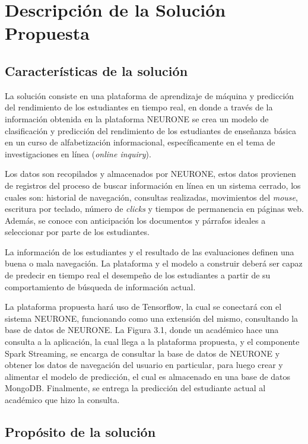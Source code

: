 \chapter{Descripción de la Solución Propuesta}
\label{chp:descripcion}

\section{Características de la solución}
La solución consiste en una plataforma de aprendizaje de máquina y predicción del rendimiento de los estudiantes en tiempo real, en donde a través de la información obtenida en la plataforma NEURONE se crea un modelo de clasificación y predicción del rendimiento de los estudiantes de enseñanza básica en un curso de alfabetización informacional, específicamente en el tema de investigaciones en línea (\textit{online inquiry}). 

Los datos son recopilados y almacenados por NEURONE, estos datos provienen de registros del proceso de buscar información en línea en un sistema cerrado, los cuales son: historial de navegación, consultas realizadas, movimientos del \textit{mouse}, escritura por teclado, número de \textit{clicks} y tiempos de permanencia en páginas web. Además, se conoce con anticipación los documentos y párrafos ideales a seleccionar por parte de los estudiantes.

La información de los estudiantes y el resultado de las evaluaciones definen una buena o mala navegación. La plataforma y el modelo a construir deberá ser capaz de predecir en tiempo real el desempeño de los estudiantes a partir de su comportamiento de búsqueda de información actual.

La plataforma propuesta hará uso de Tensorflow, la cual se conectará con el sistema NEURONE, funcionando como una extensión del mismo, consultando la base de datos de NEURONE. La Figura 3.1, donde un académico hace una consulta a la aplicación, la cual llega a la plataforma propuesta, y el componente Spark Streaming, se encarga de consultar la base de datos de NEURONE y obtener los datos de navegación del usuario en particular, para luego crear y alimentar el modelo de predicción, el cual es almacenado en una base de datos MongoDB. Finalmente, se entrega la predicción del estudiante actual al académico que hizo la consulta. 


\section{Propósito de la solución}


